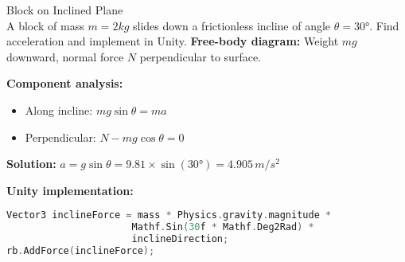 \begin{example2}{Block on Inclined Plane}\\
    A block of mass $m = 2kg$ slides down a frictionless incline of angle $\theta = 30°$. Find acceleration and implement in Unity.
    \tcblower
    \textbf{Free-body diagram:} Weight $mg$ downward, normal force $N$ perpendicular to surface.
    
    \textbf{Component analysis:}
    \begin{itemize}
        \item Along incline: $mg\sin\theta = ma$
        \item Perpendicular: $N - mg\cos\theta = 0$
    \end{itemize}
    
    \textbf{Solution:} $a = g\sin\theta = 9.81 \times \sin(30°) = 4.905 \, m/s^2$
    
    \textbf{Unity implementation:}
\begin{lstlisting}[language=C, style=basesmol]
Vector3 inclineForce = mass * Physics.gravity.magnitude * 
                      Mathf.Sin(30f * Mathf.Deg2Rad) * 
                      inclineDirection;
rb.AddForce(inclineForce);
\end{lstlisting}
\end{example2}